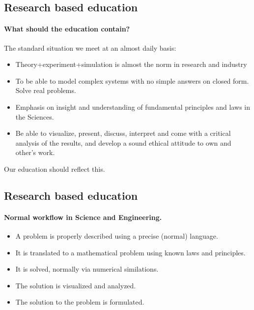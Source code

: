 \documentclass[%
twoside,                 %
final,                   %
10pt]{article}
\begin{document}
\subsection*{Research based education}

\paragraph{What should the education contain?}
The standard situation we meet at an almost daily basis:

\begin{itemize}
\item Theory+experiment+simulation is almost the norm in research and industry

\item To be able to model complex systems with no simple answers on closed form. Solve real problems.

\item Emphasis on insight and understanding of fundamental principles and laws in the Sciences.

\item Be able to visualize, present, discuss, interpret and come with a critical analysis of the results, and develop a sound ethical attitude to own and other's work.
\end{itemize}

\noindent
Our education should reflect this.





\subsection*{Research based education}

\paragraph{Normal workflow in Science and Engineering.}

\begin{itemize}
\item A problem is properly described using a precise (normal) language.

\item It is translated to a mathematical problem using known laws and  principles.

\item It is solved, normally via numerical similations.

\item The solution is visualized and analyzed.

\item The solution to the problem is formulated.
\end{itemize}
\end{document}
